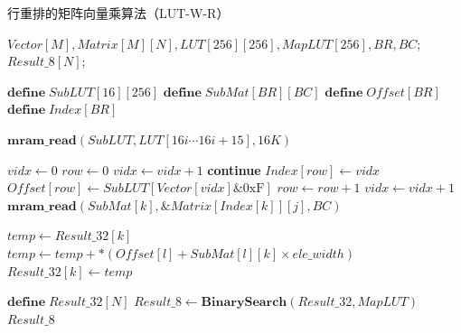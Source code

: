 \begin{algorithm}[!htbp]
    \caption{行重排的矩阵向量乘算法（LUT-W-R）}
    \label{LUT-W-R}
    \begin{algorithmic}[1]
        \Require $Vector[M], Matrix[M][N], LUT[256][256], MapLUT[256], BR, BC$; %
        \Ensure $Result\_8[N]$; %

        \State $\textbf{define}\; SubLUT[16][256]$
        \State $\textbf{define}\; SubMat[BR][BC]$
        \State $\textbf{define}\; Offset[BR]$
        \State $\textbf{define}\; Index[BR]$

            \State $\textbf{mram\_read}(SubLUT, LUT[16i \cdots 16i + 15], 16K)$
            \Comment{\textcolor{blue}{parallel in 16 for each tasklet}}

            \State $vidx \gets 0$
                \State $row \gets 0$
                \Comment{\textcolor{blue}{parallel in BR for each tasklet}}
                        \State $vidx \gets vidx + 1$
                        \State \textbf{continue}
                    \EndIf
                    \State $Index[row] \gets vidx$
                    \State $Offset[row] \gets SubLUT[Vector[vidx] \& \text{0xF}]$
                    \State $row \gets row + 1$
                    \State $vidx \gets vidx + 1$
                \EndWhile
                    \Comment{\textcolor{blue}{parallel in BR for each tasklet}}
                        \State $\textbf{mram\_read}(SubMat[k], \&Matrix[Index[k]][j], BC)$
                    \EndFor
                    
                    \Comment{\textcolor{blue}{parallel in BC for each tasklet}}
                        \State $temp \gets Result\_32[k]$
                            \State $temp \gets temp + *(Offset[l] + SubMat[l][k] \times ele\_width)$
                        \EndFor
                        \State $Result\_32[k] \gets temp$
                    \EndFor
                \EndFor
            \EndWhile
        \EndFor

        \State $\textbf{define}\; Result\_32[N]$
        \State $Result\_8 \gets \textbf{BinarySearch}(Result\_32, MapLUT)$
        \Comment{\textcolor{blue}{parallel in N for each tasklet}}
        \State \Return $Result\_8$
    \end{algorithmic}
\end{algorithm}

